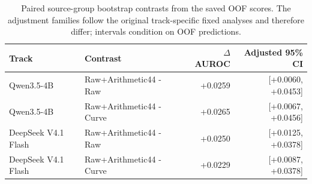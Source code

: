 \begin{table}[t]
\centering
\small
\begin{tabular}{llrr}
\toprule
Track & Contrast & $\Delta$ AUROC & Adjusted 95\% CI \\
\midrule
Qwen3.5-4B & Raw+Arithmetic44 - Raw & +0.0259 & [+0.0060, +0.0453] \\
Qwen3.5-4B & Raw+Arithmetic44 - Curve & +0.0265 & [+0.0067, +0.0456] \\
DeepSeek V4.1 Flash & Raw+Arithmetic44 - Raw & +0.0250 & [+0.0125, +0.0378] \\
DeepSeek V4.1 Flash & Raw+Arithmetic44 - Curve & +0.0229 & [+0.0087, +0.0378] \\
\bottomrule
\end{tabular}
\caption{Paired source-group bootstrap contrasts from the saved OOF scores. The adjustment families follow the original track-specific fixed analyses and therefore differ; intervals condition on OOF predictions.}
\label{tab:pecr-primary-contrasts}
\end{table}
